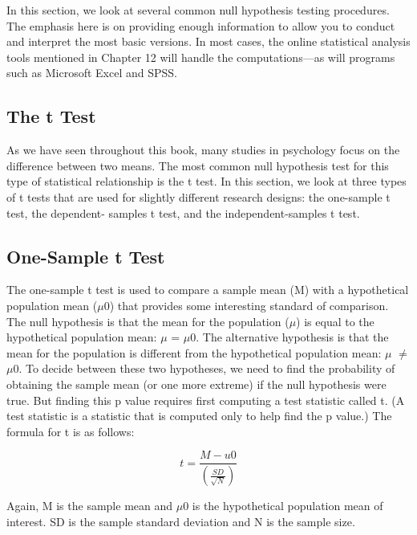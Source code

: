 In this section, we look at several common null hypothesis testing procedures. The emphasis here is on providing enough information to allow you to conduct and interpret the most basic versions. In most cases, the online statistical analysis tools mentioned in Chapter 12 will handle the computations---as will programs such as Microsoft Excel and SPSS.




\subsection{The t Test}



As we have seen throughout this book, many studies in psychology focus on the difference between two means. The most common null hypothesis test for this type of statistical relationship is the t test. In this section, we look at three types of t tests that are used for slightly different research designs: the one-sample t test, the dependent- samples t test, and the independent-samples t test.




\subsection{One-Sample t Test}




The one-sample t test is used to compare a sample mean (M) with a hypothetical population mean ($\mu$0) that provides some interesting standard of comparison. The null hypothesis is that the mean for the population ($\mu$) is equal to the hypothetical population mean: $\mu$ = $\mu$0. The alternative hypothesis is that the mean for the population is different from the hypothetical population mean: $\mu$ $\neq$ $\mu$0. To decide between these two hypotheses, we need to find the probability of obtaining the sample mean (or one more extreme) if the null hypothesis were true. But finding this p value requires first computing a test statistic called t. (A test statistic is a statistic that is computed only to help find the p value.) The formula for t is as follows:



\begin{equation}
t = \frac{M-u0}{ \left( \frac{SD}{\sqrt{N}} \right) }
\end{equation}

Again, M is the sample mean and $\mu$0 is the hypothetical population mean of interest. SD is the sample standard deviation and N is the sample size.


